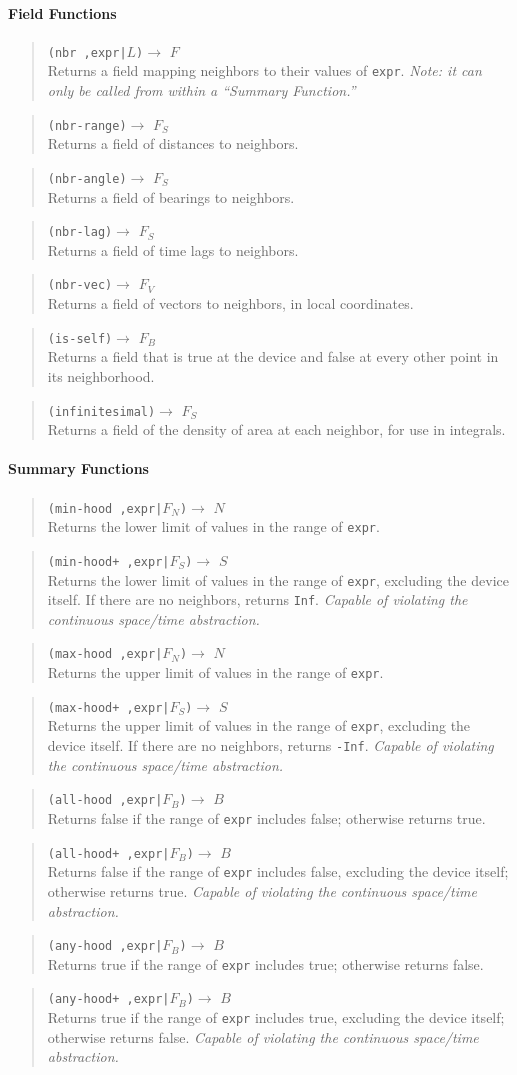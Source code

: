 \documentclass{article}
\newcommand\violation{{\em Capable of violating the continuous
    space/time abstraction.}}
\newcommand\function[3]
{\begin{quote}{\tt #1}$\rightarrow$ \type{#2} \\ #3 \end{quote}}
\newcommand\type[1]{$#1$}
\newcommand\var[1]{{\tt #1}}
\begin{document}
\paragraph{Field Functions}

\function{(nbr ,expr|\type{L})}{F}{Returns a field mapping neighbors
  to their values of \var{expr}. {\it Note: it can only be called from
  within a ``Summary Function.''}}

\function{(nbr-range)}{F_S}{Returns a field of distances to neighbors.}
\function{(nbr-angle)}{F_S}{Returns a field of bearings to neighbors.}
\function{(nbr-lag)}{F_S}{Returns a field of time lags to neighbors.}
\function{(nbr-vec)}{F_V}{Returns a field of vectors to neighbors, in
  local coordinates.}
\function{(is-self)}{F_B}{Returns a field that is true at the device
  and false at every other point in its neighborhood.}

\function{(infinitesimal)}{F_S}{Returns a field of the density of
  area at each neighbor, for use in integrals.}

\paragraph{Summary Functions}

\function{(min-hood ,expr|\type{F_N})}{N}{Returns the lower limit of
  values in the range of \var{expr}.}
\function{(min-hood+ ,expr|\type{F_S})}{S}{Returns the lower limit of
  values in the range of \var{expr}, excluding the device itself.  
  If there are no neighbors, returns \var{Inf}. \violation{}}
\function{(max-hood ,expr|\type{F_N})}{N}{Returns the upper limit of
  values in the range of \var{expr}.}
\function{(max-hood+ ,expr|\type{F_S})}{S}{Returns the upper limit of
  values in the range of \var{expr}, excluding the device itself.  
  If there are no neighbors, returns \var{-Inf}. \violation{}}

\function{(all-hood ,expr|\type{F_B})}{B}{Returns false if the
  range of \var{expr} includes false; otherwise returns true.}
\function{(all-hood+ ,expr|\type{F_B})}{B}{Returns false if the range
  of \var{expr} includes false, excluding the device itself; otherwise
  returns true. \violation{}}
\function{(any-hood ,expr|\type{F_B})}{B}{Returns true if the
  range of \var{expr} includes true; otherwise returns false.}
\function{(any-hood+ ,expr|\type{F_B})}{B}{Returns true if the range
  of \var{expr} includes true, excluding the device itself; otherwise
  returns false. \violation{}}
\end{document}
